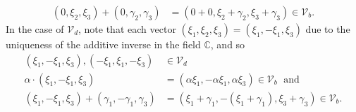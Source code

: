 \documentclass[12pt]{article}
\newenvironment{problem}[2][Problem]{\begin{trivlist} \item[\hskip \labelsep {\bfseries #1}\hskip \labelsep {\bfseries #2.}]}{\end{trivlist}}
\newenvironment{solution}[1][Solution]{\begin{trivlist} \item[\hskip \labelsep {\bfseries #1}]}{\end{trivlist}}
\begin{document}
\begin{problem}{4}
\begin{solution}
\begin{align*}
  (0,\xi_{2},\xi_{3}) + (0,\gamma_{2},\gamma_{3}) &=  (0+0,\xi_{2}+\gamma_{2},\xi_{3}+\gamma_{3})\in \mathcal{V}_{b}.
\end{align*}
In the case of $\mathcal{V}_{d}$, note that each vector  $(\xi_{1},\xi_{2},\xi_{3}) = (\xi_{1},-\xi_{1},\xi_{3})$ due to the uniqueness of the additive inverse in the field $\mathbb{C}$, and so 
\begin{align*}
  (\xi_{1},-\xi_{1},\xi_{3}),(-\xi_{1},\xi_{1},-\xi_{3})&\in \mathcal{V}_{d}\\
  \alpha\cdot (\xi_{1},-\xi_{1},\xi_{3}) &= (\alpha\xi_{1},-\alpha\xi_{1},\alpha\xi_{3})\in \mathcal{V}_{b} \;\text{ and }\\
  (\xi_{1},-\xi_{1},\xi_{3}) + (\gamma_{1},-\gamma_{1},\gamma_{3}) &=  (\xi_{1}+\gamma_{1},-(\xi_{1}+\gamma_{1}),\xi_{3}+\gamma_{3})\in \mathcal{V}_{b}.
\end{align*}
\end{solution}
\end{problem}
\end{document}
